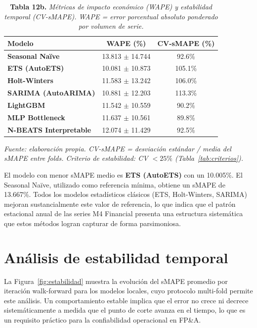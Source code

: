 \begin{table}[H]
\caption{\textbf{Tabla 12b.} \textit{Métricas de impacto económico (WAPE) y estabilidad temporal (CV-sMAPE). WAPE = error porcentual absoluto ponderado por volumen de serie.}}
\label{tab:resultados_comp}
\vspace{4pt}
\small
\begin{tabular}{>{\raggedright\arraybackslash}p{4.0cm}cc}
\toprule
\textbf{Modelo} & \textbf{WAPE (\%)} & \textbf{CV-sMAPE (\%)} \\
\midrule
\textbf{Seasonal Naïve} & 13.813 $\pm$ 14.744 & 92.6\% \\
\textbf{ETS (AutoETS)} & 10.081 $\pm$ 10.873 & 105.1\% \\
\textbf{Holt-Winters} & 11.583 $\pm$ 13.242 & 106.0\% \\
\textbf{SARIMA (AutoARIMA)} & 10.881 $\pm$ 12.203 & 113.3\% \\
\textbf{LightGBM} & 11.542 $\pm$ 10.559 & 90.2\% \\
\textbf{MLP Bottleneck} & 11.637 $\pm$ 10.561 & 89.8\% \\
\textbf{N-BEATS Interpretable} & 12.074 $\pm$ 11.429 & 92.5\% \\
\bottomrule
\end{tabular}
\normalsize
\vspace{4pt}

\small\textit{Fuente: elaboración propia. CV-sMAPE = desviación estándar / media del sMAPE entre folds. Criterio de estabilidad: CV $< 25\%$ (Tabla~\ref{tab:criterios}).}
\end{table}



El modelo con menor sMAPE medio es \textbf{ETS (AutoETS)} con un 10.005\%. El Seasonal Naïve, utilizado como referencia mínima, obtiene un sMAPE de 13.667\%. Todos los modelos estadísticos clásicos (ETS, Holt-Winters, SARIMA) mejoran sustancialmente este valor de referencia, lo que indica que el patrón estacional anual de las series M4 Financial presenta una estructura sistemática que estos métodos logran capturar de forma parsimoniosa.

\section{Análisis de estabilidad temporal}
\label{sec:estabilidad_temporal}

La Figura~\ref{fig:estabilidad} muestra la evolución del sMAPE promedio por iteración walk-forward para los modelos locales, cuyo protocolo multi-fold permite este análisis. Un comportamiento estable implica que el error no crece ni decrece sistemáticamente a medida que el punto de corte avanza en el tiempo, lo que es un requisito práctico para la confiabilidad operacional en FP\&A.

